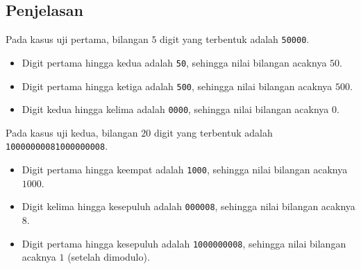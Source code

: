 \documentclass{article}
\begin{document}
\subsection*{Penjelasan}
Pada kasus uji pertama, bilangan $5$ digit yang terbentuk adalah \lstinline{50000}.

\begin{itemize}
    \setlength\itemsep{0pt}
    \item Digit pertama hingga kedua adalah \lstinline{50}, sehingga nilai bilangan acaknya $50$.
    \item Digit pertama hingga ketiga adalah \lstinline{500}, sehingga nilai bilangan acaknya $500$.
    \item Digit kedua hingga kelima adalah \lstinline{0000}, sehingga nilai bilangan acaknya $0$.
\end{itemize}

Pada kasus uji kedua, bilangan $20$ digit yang terbentuk adalah \lstinline{10000000081000000008}.

\begin{itemize}
    \setlength\itemsep{0pt}
    \item Digit pertama hingga keempat adalah \lstinline{1000}, sehingga nilai bilangan acaknya $1000$.
    \item Digit kelima hingga kesepuluh adalah \lstinline{000008}, sehingga nilai bilangan acaknya $8$.
    \item Digit pertama hingga kesepuluh adalah \lstinline{1000000008}, sehingga nilai bilangan acaknya $1$ (setelah dimodulo).
\end{itemize}
\end{document}
